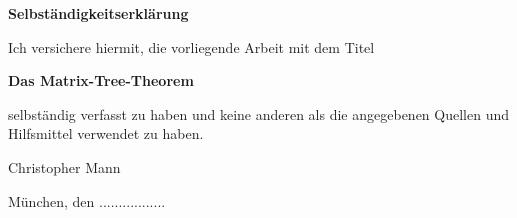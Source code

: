 \documentclass[11pt,a4paper,twoside, draft]{article}%
\begin{document}
\vspace*{1cm}
{\huge \textbf{Selbständigkeitserklärung}}\\
\vspace*{1.5cm}

Ich versichere hiermit, die vorliegende Arbeit mit dem Titel

\begin{center}
	\textbf{Das Matrix-Tree-Theorem}
\end{center}

selbständig verfasst zu haben und keine anderen als die angegebenen Quellen und Hilfsmittel verwendet zu haben.

\vspace*{3cm}

Christopher Mann

\vspace*{1cm}
München, den .................
\end{document}
